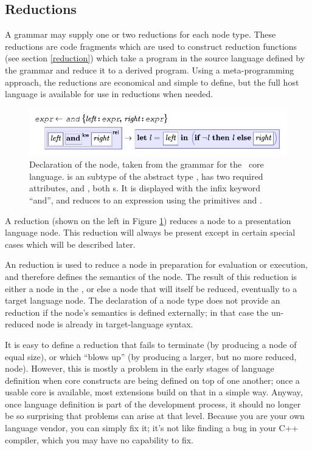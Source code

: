 \subsection{Reductions}
A grammar may supply one or two reductions for each node type. These reductions are code fragments which are used to construct reduction functions (see section \ref{reduction}) which take a program in the source language defined by the grammar and reduce it to a derived program. Using a meta-programming approach, the reductions are economical and simple to define, but the full host language is available for use in reductions when needed. %

\begin{figure}[ht]

  \includegraphics{src/image/and.pdf}
  \caption[Declaration of the  node of the core language.]{Declaration of the  node, taken from the grammar for the \Meta\ core language.  is an subtype of the abstract type , has two required attributes,  and , both s. It is displayed with the infix keyword ``and'', and reduces to an expression using the primitives  and .}
  \label{fig-and}
\end{figure}

A  reduction (shown on the left in Figure \ref{fig-and}) reduces a node to a presentation language node. This reduction will always be present except in certain special cases which will be described later.

An  reduction is used to reduce a node in preparation for evaluation or execution, and therefore defines the semantics of the node. The result of this reduction is either a node in the , or else a node that will itself be reduced, eventually to a target language node. The declaration of a node type does not provide an  reduction if the node's semantics is defined externally; in that case the un-reduced node is already in target-language syntax.

It is easy to define a reduction that fails to terminate (by producing a node of equal size), or which ``blows up'' (by producing a larger, but no more reduced, node). However, this is mostly a problem in the early stages of language definition when core constructs are being defined on top of one another; once a usable core is available, most extensions build on that in a simple way. Anyway, once language definition is part of the development process, it should no longer be so surprising that problems can arise at that level. Because you are your own language vendor, you can simply fix it; it's not like finding a bug in your C++ compiler, which you may have no capability to fix.

